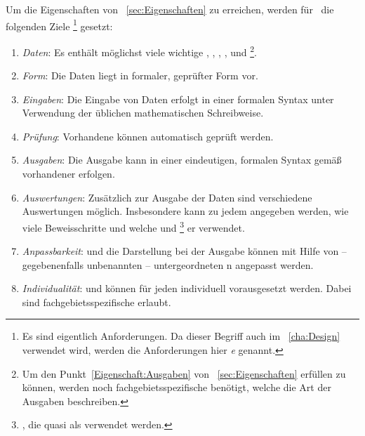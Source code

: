 Um die Eigenschaften von \sectionname~\vref{sec:Eigenschaften} zu erreichen, werden für \ASBA\ die folgenden Ziele%
\footnote{%
	Es sind eigentlich Anforderungen.
	Da dieser Begriff auch im \chaptername~\vref{cha:Design} verwendet wird, werden die Anforderungen hier \emph{}\emph{e} genannt.%
}
gesetzt:
\begin{enumerate}
	
	\item \label{Ziel:Daten} \emph{Daten}:
	Es enthält möglichst viele wichtige , , , ,  und %
	\footnote{%
		Um den Punkt~\ref{Eigenschaft:Ausgaben} von \sectionname~\vref{sec:Eigenschaften} erfüllen zu können, werden noch fachgebietsspezifische  benötigt, 	welche die Art der Ausgaben beschreiben.%
	}.
	
	\item \label{Ziel:Form} \emph{Form}:
	Die Daten liegt in formaler, geprüfter Form vor.
	
	\item \label{Ziel:Eingaben} \emph{Eingaben}:
	Die Eingabe von Daten erfolgt in einer formalen Syntax unter Verwendung der üblichen mathematischen Schreibweise.
	
	\item \label{Ziel:Prüfung} \emph{Prüfung}:
	Vorhandene  können automatisch geprüft werden.
	
	\item \label{Ziel:Ausgaben} \emph{Ausgaben}:
	Die Ausgabe kann in einer eindeutigen, formalen Syntax gemäß vorhandener  erfolgen.
	
	\item \label{Ziel:Auswertungen} \emph{Auswertungen}:
	Zusätzlich zur Ausgabe der Daten sind verschiedene Auswertungen möglich.
	Insbesondere kann zu jedem  angegeben werden, wie viele Beweisschritte und welche  und %
	\footnote{
		, die quasi als  verwendet werden.%
	}
	er verwendet.
	
	\item \label{Ziel:Anpassbarkeit} \emph{Anpassbarkeit}:
	 und die Darstellung bei der Ausgabe können mit Hilfe von -- gegebenenfalls unbenannten -- untergeordneten n angepasst werden.
	
	\item \label{Ziel:Individualität} \emph{Individualität}:
	 und  können für jeden  individuell vorausgesetzt werden.
	Dabei sind fachgebietsspezifische  erlaubt.
	

\end{enumerate}
